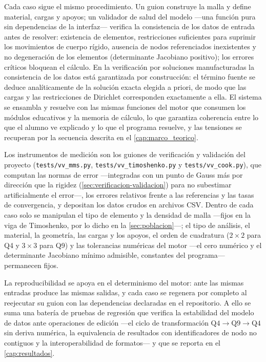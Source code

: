 Cada caso sigue el mismo procedimiento. Un guion construye la malla y define material, cargas y apoyos; un validador de salud del modelo —una función pura sin dependencias de la interfaz— verifica la consistencia de los datos de entrada antes de resolver: existencia de elementos, restricciones suficientes para suprimir los movimientos de cuerpo rígido, ausencia de nodos referenciados inexistentes y no degeneración de los elementos (determinante Jacobiano positivo); los errores críticos bloquean el cálculo. En la verificación por soluciones manufacturadas la consistencia de los datos está garantizada por construcción: el término fuente se deduce analíticamente de la solución exacta elegida a priori, de modo que las cargas y las restricciones de Dirichlet corresponden exactamente a ella. El sistema se ensambla y resuelve con las mismas funciones del motor que consumen los módulos educativos y la memoria de cálculo, lo que garantiza coherencia entre lo que el alumno ve explicado y lo que el programa resuelve, y las tensiones se recuperan por la secuencia descrita en el \autoref{cap:marco_teorico}.

Los instrumentos de medición son los guiones de verificación y validación del proyecto (\texttt{tests/vv\_mms.py}, \texttt{tests/vv\_timoshenko.py} y \texttt{tests/vv\_cook.py}), que computan las normas de error —integradas con un punto de Gauss más por dirección que la rigidez (\autoref{sec:verificacion-validacion}) para no subestimar artificialmente el error—, los errores relativos frente a las referencias y las tasas de convergencia, y depositan los datos crudos en archivos CSV. Dentro de cada caso solo se manipulan el tipo de elemento y la densidad de malla —fijos en la viga de Timoshenko, por lo dicho en la \autoref{sec:poblacion}—; el tipo de análisis, el material, la geometría, las cargas y los apoyos, el orden de cuadratura ($2\times2$ para Q4 y $3\times3$ para Q9) y las tolerancias numéricas del motor —el cero numérico y el determinante Jacobiano mínimo admisible, constantes del programa— permanecen fijos.

La reproducibilidad se apoya en el determinismo del motor: ante las mismas entradas produce las mismas salidas, y cada caso se regenera por completo al reejecutar su guion con las dependencias declaradas en el repositorio. A ello se suma una batería de pruebas de regresión que verifica la estabilidad del modelo de datos ante operaciones de edición —el ciclo de transformación $\text{Q4}\rightarrow\text{Q9}\rightarrow\text{Q4}$ sin deriva numérica, la equivalencia de resultados con identificadores de nodo no contiguos y la interoperabilidad de formatos— y que se reporta en el \autoref{cap:resultados}.

